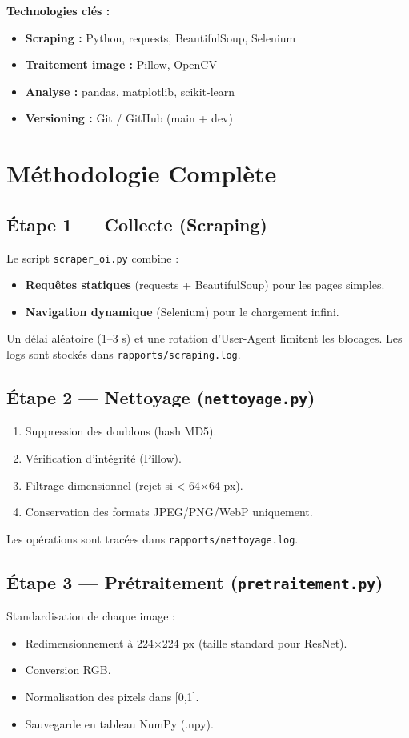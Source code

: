 \documentclass[12pt,a4paper]{article}
\begin{document}
\textbf{Technologies clés :}
\begin{itemize}[noitemsep]
  \item \textbf{Scraping :} Python, requests, BeautifulSoup, Selenium
  \item \textbf{Traitement image :} Pillow, OpenCV
  \item \textbf{Analyse :} pandas, matplotlib, scikit-learn
  \item \textbf{Versioning :} Git / GitHub (main + dev)
\end{itemize}

\section{Méthodologie Complète}

\subsection{Étape 1 — Collecte (Scraping)}
Le script \texttt{scraper\_oi.py} combine :
\begin{itemize}[noitemsep]
  \item \textbf{Requêtes statiques} (requests + BeautifulSoup) pour les pages simples.
  \item \textbf{Navigation dynamique} (Selenium) pour le chargement infini.
\end{itemize}
Un délai aléatoire (1–3 s) et une rotation d'User-Agent limitent les blocages.  
Les logs sont stockés dans \texttt{rapports/scraping.log}.

\subsection{Étape 2 — Nettoyage (\texttt{nettoyage.py})}
\begin{enumerate}[noitemsep]
  \item Suppression des doublons (hash MD5).
  \item Vérification d'intégrité (Pillow).
  \item Filtrage dimensionnel (rejet si < 64×64 px).
  \item Conservation des formats JPEG/PNG/WebP uniquement.
\end{enumerate}
Les opérations sont tracées dans \texttt{rapports/nettoyage.log}.

\subsection{Étape 3 — Prétraitement (\texttt{pretraitement.py})}
Standardisation de chaque image :
\begin{itemize}[noitemsep]
  \item Redimensionnement à 224×224 px (taille standard pour ResNet).
  \item Conversion RGB.
  \item Normalisation des pixels dans [0,1].
  \item Sauvegarde en tableau NumPy (.npy).
\end{itemize}
\end{document}
